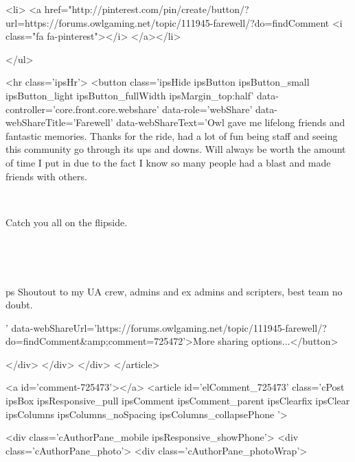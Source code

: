 			<li>
<a href="http://pinterest.com/pin/create/button/?url=https://forums.owlgaming.net/topic/111945-farewell/?do=findComment%
	<i class="fa fa-pinterest"></i>
</a></li>
		
	</ul>


	<hr class='ipsHr'>
	<button class='ipsHide ipsButton ipsButton_small ipsButton_light ipsButton_fullWidth ipsMargin_top:half' data-controller='core.front.core.webshare' data-role='webShare' data-webShareTitle='Farewell' data-webShareText='Owl gave me lifelong friends and fantastic memories. Thanks for the ride, had a lot of fun being staff and seeing this community go through its ups and downs. Will always be worth the amount of time I put in due to the fact I know so many people had a blast and made friends with others.
 


	 
 


	Catch you all on the flipside.
 


	 


	 
 


	 
 


	ps Shoutout to my UA crew, admins and ex admins and scripters, best team no doubt.
 
' data-webShareUrl='https://forums.owlgaming.net/topic/111945-farewell/?do=findComment&amp;comment=725472'>More sharing options...</button>

	
</div>
</div>
	</div>
</article>
					
				
					
					
					



<a id='comment-725473'></a>
<article  id='elComment_725473' class='cPost ipsBox ipsResponsive_pull  ipsComment  ipsComment_parent ipsClearfix ipsClear ipsColumns ipsColumns_noSpacing ipsColumns_collapsePhone    '>
	

	

	<div class='cAuthorPane_mobile ipsResponsive_showPhone'>
		<div class='cAuthorPane_photo'>
			<div class='cAuthorPane_photoWrap'>
				


